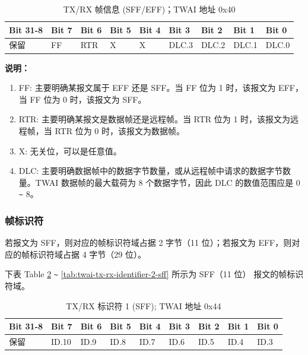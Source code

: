 \documentclass[main\_\_CN.tex]{subfiles}
\begin{document}
\begin{longtable}[c]{|p{1.4cm}|p{1.4cm}|p{1.4cm}|p{1.4cm}|p{1.4cm}|p{1.4cm}|p{1.4cm}|p{1.4cm}|p{1.4cm}|}
    \caption{TX/RX 帧信息 (SFF/EFF)；TWAI 地址 0x40}
    \label{tab:twai-tx-rx-frame-info-sff-eff}\\
    \hline
       \rowcolor{lightgray}
    \textbf{Bit 31-8} & \textbf{Bit 7} & \textbf{Bit 6} & \textbf{Bit 5} & \textbf{Bit 4} & \textbf{Bit 3} & \textbf{Bit 2} & \textbf{Bit 1} & \textbf{Bit 0}\\\hline
    保留 & FF & RTR  & X  & X  & DLC.3 & DLC.2 & DLC.1 & DLC.0\\
    \hline
\end{longtable}
\vspace{-1.5em}
{\bfseries 说明：}\\
\begin{enumerate}
    \item FF: 主要明确某报文属于 EFF 还是 SFF。当 FF 位为 1 时，该报文为 EFF，当 FF 位为 0 时，该报文为 SFF。
    \item RTR: 主要明确某报文是数据帧还是远程帧。当 RTR 位为 1 时，该报文为远程帧，当 RTR 位为 0 时，该报文为数据帧。
    \item X: 无关位，可以是任意值。
    \item DLC: 主要明确数据帧中的数据字节数量，或从远程帧中请求的数据字节数量。TWAI 数据帧的最大载荷为 8 个数据字节，因此 DLC 的数值范围应是 0 \verb+~+ 8。
\end{enumerate}

\subsubsection{帧标识符}
若报文为 SFF，则对应的帧标识符域占据 2 字节（11 位）；若报文为 EFF，则对应的帧标识符域占据 4 字节（29 位）。

下表 Table \ref{tab:twai-tx-rx-identifier-1-sff} \verb+~+ \ref{tab:twai-tx-rx-identifier-2-sff} 所示为 SFF（11 位） 报文的帧标识符域。

\begin{longtable}[c]{|p{1.4cm}|p{1.4cm}|p{1.4cm}|p{1.4cm}|p{1.4cm}|p{1.4cm}|p{1.4cm}|p{1.4cm}|p{1.4cm}|}
    \caption{TX/RX 标识符 1 (SFF); TWAI 地址 0x44}
    \label{tab:twai-tx-rx-identifier-1-sff}\\
    \hline
       \rowcolor{lightgray}
    \textbf{Bit 31-8} & \textbf{Bit 7} & \textbf{Bit 6} & \textbf{Bit 5} & \textbf{Bit 4} & \textbf{Bit 3} & \textbf{Bit 2} & \textbf{Bit 1} & \textbf{Bit 0}\\\hline
    保留 & ID.10 & ID.9 & ID.8 & ID.7 & ID.6 & ID.5 & ID.4 & ID.3\\
    \hline
\end{longtable}
\end{document}
